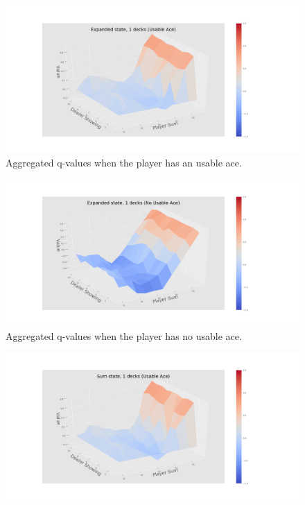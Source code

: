 \begin{center}
\begin{figure}[H]
  	 \includegraphics[width=1.2\textwidth]{./figures/ace_3D_exp_1_decks.png}
   \caption{Aggregated q-values when the player has an usable ace.\label{sfig:3Dnd1}}
\end{figure}
 \begin{figure}[H]%
  	 \includegraphics[width=1.2\textwidth]{./figures/noace_3D_exp_1_decks.png}
   \caption{Aggregated q-values when the player has no usable ace.\label{sfig:3Dnd2}}
 \end{figure}
 \begin{figure}[H]%
  	 \includegraphics[width=1.2\textwidth]{./figures/ace_3D_sum_1_decks.png}

\end{figure}
\end{center}
